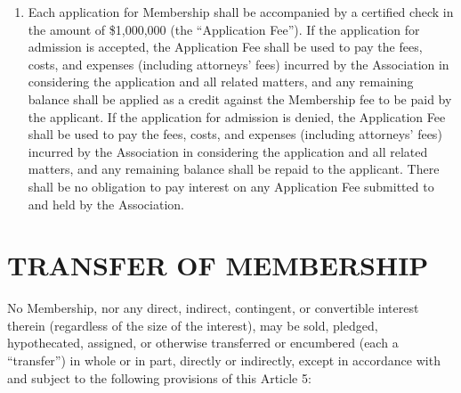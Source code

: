\documentclass[]{book}
\begin{document}
\begin{enumerate}
\item
  Each application for Membership shall be accompanied by a certified check in the amount of \$1,000,000 (the ``Application Fee''). If the application for admission is accepted, the Application Fee shall be used to pay the fees, costs, and expenses (including attorneys' fees) incurred by the Association in considering the application and all related matters, and any remaining balance shall be applied as a credit against the Membership fee to be paid by the applicant. If the application for admission is denied, the Application Fee shall be used to pay the fees, costs, and expenses (including attorneys' fees) incurred by the Association in considering the application and all related matters, and any remaining balance shall be repaid to the applicant. There shall be no obligation to pay interest on any Application Fee submitted to and held by the Association.
\end{enumerate}

\hypertarget{transfer-of-membership}{%
\section{TRANSFER OF MEMBERSHIP}\label{transfer-of-membership}}

No Membership, nor any direct, indirect, contingent, or convertible interest therein (regardless of the size of the interest), may be sold, pledged, hypothecated, assigned, or otherwise transferred or encumbered (each a ``transfer'') in whole or in part, directly or indirectly, except in accordance with and subject to the following provisions of this Article 5:
\end{document}
